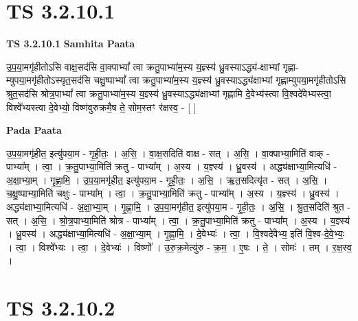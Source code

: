 \documentclass[17pt]{extarticle}
\begin{document}

\section{ TS 3.2.10.1 }

\textbf{TS 3.2.10.1 } \newline
\textbf{Samhita Paata} \newline

उ॒प॒या॒मगृ॑हीतोऽसि वाक्ष॒सद॑सि वा॒क्पाभ्यां᳚ त्वा क्रतु॒पाभ्या॑म॒स्य य॒ज्ञ्स्य॑ ध्रु॒वस्याऽद्ध्य॑-क्षाभ्यां गृह्णा-म्युपया॒मगृ॑हीतोऽस्यृत॒सद॑सि चक्षु॒ष्पाभ्यां᳚ त्वा क्रतु॒पाभ्या॑म॒स्य य॒ज्ञ्स्य॑ ध्रु॒वस्याऽद्ध्य॑क्षाभ्यां गृह्णाम्युपया॒मगृ॑हीतोऽसि श्रुत॒सद॑सि श्रोत्र॒पाभ्यां᳚ त्वा क्रतु॒पाभ्या॑म॒स्य य॒ज्ञ्स्य॑ ध्रु॒वस्याऽद्ध्य॑क्षाभ्यां गृह्णामि दे॒वेभ्य॑स्त्वा वि॒श्वदे॑वेभ्यस्त्वा॒ विश्वे᳚भ्यस्त्वा दे॒वेभ्यो॒ विष्ण॑वुरुक्रमै॒ष ते॒ सोम॒स्तꣳ र॑क्षस्व॒ - [  ] \newline

\textbf{Pada Paata} \newline

उ॒प॒या॒मगृ॑हीत॒ इत्यु॑पया॒म - गृ॒ही॒तः॒ । अ॒सि॒ । वा॒क्ष॒सदिति॑ वाक्ष - सत् । अ॒सि॒ । वा॒क्पाभ्या॒मिति॑ वाक् - पाभ्या᳚म् । त्वा॒ । क्र॒तु॒पाभ्या॒मिति॑ क्रतु - पाभ्या᳚म् । अ॒स्य । य॒ज्ञ्स्य॑ । ध्रु॒वस्य॑ । अद्ध्य॑क्षाभ्या॒मित्यधि॑ - अ॒क्षा॒भ्या॒म् । गृ॒ह्णा॒मि॒ । उ॒प॒या॒मगृ॑हीत॒ इत्यु॑पया॒म - गृ॒ही॒तः॒ । अ॒सि॒ । ऋ॒त॒सदित्यृ॑त - सत् । अ॒सि॒ । च॒क्षु॒ष्पाभ्या॒मिति॑ चक्षुः - पाभ्या᳚म् । त्वा॒ । क्र॒तु॒पाभ्या॒मिति॑ क्रतु - पाभ्या᳚म् । अ॒स्य । य॒ज्ञ्स्य॑ । ध्रु॒वस्य॑ । अद्ध्य॑क्षाभ्या॒मित्यधि॑ - अ॒क्षा॒भ्या॒म् । गृ॒ह्णा॒मि॒ । उ॒प॒या॒मगृ॑हीत॒ इत्यु॑पया॒म - गृ॒ही॒तः॒ । अ॒सि॒ । श्रु॒त॒सदिति॑ श्रुत - सत् । अ॒सि॒ । श्रो॒त्र॒पाभ्या॒मिति॑ श्रोत्र - पाभ्या᳚म् । त्वा॒ । क्र॒तु॒पाभ्या॒मिति॑ क्रतु - पाभ्या᳚म् । अ॒स्य । य॒ज्ञ्स्य॑ । ध्रु॒वस्य॑ । अद्ध्य॑क्षाभ्या॒मित्यधि॑ - अ॒क्षा॒भ्या॒म् । गृ॒ह्णा॒मि॒ । दे॒वेभ्यः॑ । त्वा॒ । वि॒श्वदे॑वेभ्य॒ इति॑ वि॒श्व-दे॒वे॒भ्यः॒ । त्वा॒ । विश्वे᳚भ्यः । त्वा॒ । दे॒वेभ्यः॑ । विष्णो᳚ । उ॒रु॒क्र॒मेत्यु॑रु - क्र॒म॒ । ए॒षः । ते॒ । सोमः॑ । तम् । र॒क्ष॒स्व॒ ।  \newline





\section{ TS 3.2.10.2 }
\end{document}
